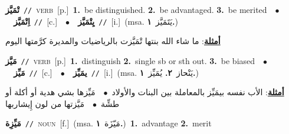 \documentclass[10pt,a4paper,twoside]{article} %
\begin{document}
\begin{multicols}{2}
{\setlength\topsep{0pt}\textbf{\foreignlanguage{arabic}{تْمَيَّز}}\ {\color{gray}\texttt{//}\color{black}}\ \textsc{verb}\ [p.]\ \textbf{1.}~be distinguished.  \textbf{2.}~be advantaged.  \textbf{3.}~be merited\ \ $\bullet$\ \ \setlength\topsep{0pt}\textbf{\foreignlanguage{arabic}{اِتْمَيَّز}}\ {\color{gray}\texttt{//}\color{black}}\ [c.]\ \ $\bullet$\ \ \setlength\topsep{0pt}\textbf{\foreignlanguage{arabic}{يِتْمَيَّز}}\ {\color{gray}\texttt{//}\color{black}}\ [i.]\ \color{gray}(msa. \foreignlanguage{arabic}{يَتَمَيَّز}~\foreignlanguage{arabic}{\textbf{١.}})\color{black}\  \begin{flushright}\color{gray}\foreignlanguage{arabic}{\textbf{\underline{\foreignlanguage{arabic}{أمثلة}}}: ما شاء الله بنتها تْمَيَّزت بالرياضيات والمديرة كرَّمتها اليوم}\end{flushright}\color{black}} \vspace{2mm}

{\setlength\topsep{0pt}\textbf{\foreignlanguage{arabic}{مَيَّز}}\ {\color{gray}\texttt{//}\color{black}}\ \textsc{verb}\ [p.]\ \textbf{1.}~distinguish  \textbf{2.}~single sb or sth out.  \textbf{3.}~be biased\ \ $\bullet$\ \ \setlength\topsep{0pt}\textbf{\foreignlanguage{arabic}{مَيِّز}}\ {\color{gray}\texttt{//}\color{black}}\ [c.]\ \ $\bullet$\ \ \setlength\topsep{0pt}\textbf{\foreignlanguage{arabic}{يمَيِّز}}\ {\color{gray}\texttt{//}\color{black}}\ [i.]\ \color{gray}(msa. \foreignlanguage{arabic}{يَنْحاز}~\foreignlanguage{arabic}{\textbf{٢.}}  \foreignlanguage{arabic}{يُمَيِّز}~\foreignlanguage{arabic}{\textbf{١.}})\color{black}\  \begin{flushright}\color{gray}\foreignlanguage{arabic}{\textbf{\underline{\foreignlanguage{arabic}{أمثلة}}}: الأب نفسه بيمَيِّز بالمعاملة بين البنات والأولاد\ $\bullet$\ \  مَيِّزها بشي هدية أو أكلة أو طشِّة\ $\bullet$\ \  مَيَّزتها من لون إِيشاربها}\end{flushright}\color{black}} \vspace{2mm}

{\setlength\topsep{0pt}\textbf{\foreignlanguage{arabic}{مَيِّزِة}}\ {\color{gray}\texttt{//}\color{black}}\ \textsc{noun}\ [f.]\ \color{gray}(msa. \foreignlanguage{arabic}{مَيّزَة}~\foreignlanguage{arabic}{\textbf{١.}})\color{black}\ \textbf{1.}~advantage  \textbf{2.}~merit\ } \vspace{2mm}


\end{multicols}
\end{document}
